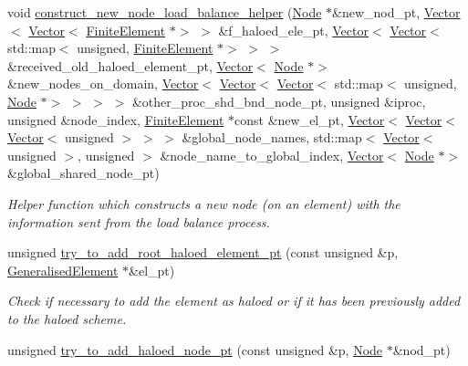 \begin{DoxyCompactItemize}
void \hyperlink{classoomph_1_1RefineableTriangleMesh_aa772a7cb98786a8296cc1d0b51e40f88}{construct\+\_\+new\+\_\+node\+\_\+load\+\_\+balance\+\_\+helper} (\hyperlink{classoomph_1_1Node}{Node} $\ast$\&new\+\_\+nod\+\_\+pt, \hyperlink{classoomph_1_1Vector}{Vector}$<$ \hyperlink{classoomph_1_1Vector}{Vector}$<$ \hyperlink{classoomph_1_1FiniteElement}{Finite\+Element} $\ast$$>$ $>$ \&f\+\_\+haloed\+\_\+ele\+\_\+pt, \hyperlink{classoomph_1_1Vector}{Vector}$<$ \hyperlink{classoomph_1_1Vector}{Vector}$<$ std\+::map$<$ unsigned, \hyperlink{classoomph_1_1FiniteElement}{Finite\+Element} $\ast$$>$ $>$ $>$ \&received\+\_\+old\+\_\+haloed\+\_\+element\+\_\+pt, \hyperlink{classoomph_1_1Vector}{Vector}$<$ \hyperlink{classoomph_1_1Node}{Node} $\ast$$>$ \&new\+\_\+nodes\+\_\+on\+\_\+domain, \hyperlink{classoomph_1_1Vector}{Vector}$<$ \hyperlink{classoomph_1_1Vector}{Vector}$<$ \hyperlink{classoomph_1_1Vector}{Vector}$<$ std\+::map$<$ unsigned, \hyperlink{classoomph_1_1Node}{Node} $\ast$$>$ $>$ $>$ $>$ \&other\+\_\+proc\+\_\+shd\+\_\+bnd\+\_\+node\+\_\+pt, unsigned \&iproc, unsigned \&node\+\_\+index, \hyperlink{classoomph_1_1FiniteElement}{Finite\+Element} $\ast$const \&new\+\_\+el\+\_\+pt, \hyperlink{classoomph_1_1Vector}{Vector}$<$ \hyperlink{classoomph_1_1Vector}{Vector}$<$ \hyperlink{classoomph_1_1Vector}{Vector}$<$ unsigned $>$ $>$ $>$ \&global\+\_\+node\+\_\+names, std\+::map$<$ \hyperlink{classoomph_1_1Vector}{Vector}$<$ unsigned $>$, unsigned $>$ \&node\+\_\+name\+\_\+to\+\_\+global\+\_\+index, \hyperlink{classoomph_1_1Vector}{Vector}$<$ \hyperlink{classoomph_1_1Node}{Node} $\ast$$>$ \&global\+\_\+shared\+\_\+node\+\_\+pt)
\begin{DoxyCompactList}\small\item\em Helper function which constructs a new node (on an element) with the information sent from the load balance process. \end{DoxyCompactList}\item 
unsigned \hyperlink{classoomph_1_1RefineableTriangleMesh_a40ed8992d60508600cb3f3d0b9fb2c46}{try\+\_\+to\+\_\+add\+\_\+root\+\_\+haloed\+\_\+element\+\_\+pt} (const unsigned \&p, \hyperlink{classoomph_1_1GeneralisedElement}{Generalised\+Element} $\ast$\&el\+\_\+pt)
\begin{DoxyCompactList}\small\item\em Check if necessary to add the element as haloed or if it has been previously added to the haloed scheme. \end{DoxyCompactList}\item 
unsigned \hyperlink{classoomph_1_1RefineableTriangleMesh_a0bc1283a0cf4ea45abefea1930ef748a}{try\+\_\+to\+\_\+add\+\_\+haloed\+\_\+node\+\_\+pt} (const unsigned \&p, \hyperlink{classoomph_1_1Node}{Node} $\ast$\&nod\+\_\+pt)
$$
\end{DoxyCompactItemize}
